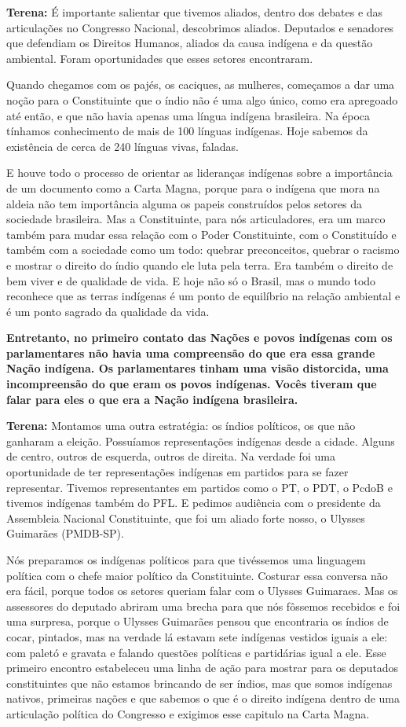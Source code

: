 \textbf{Terena:} É importante salientar que tivemos aliados, dentro dos
debates e das articulações no Congresso Nacional, descobrimos aliados.
Deputados e senadores que defendiam os Direitos Humanos, aliados da
causa indígena e da questão ambiental. Foram oportunidades que esses
setores encontraram.

Quando chegamos com os pajés, os caciques, as mulheres, começamos a dar
uma noção para o Constituinte que o índio não é uma algo único, como era
apregoado até então, e que não havia apenas uma língua indígena
brasileira. Na época tínhamos conhecimento de mais de 100 línguas
indígenas. Hoje sabemos da existência de cerca de 240 línguas vivas,
faladas.

E houve todo o processo de orientar as lideranças indígenas sobre a
importância de um documento como a Carta Magna, porque para o indígena
que mora na aldeia não tem importância alguma os papeis construídos
pelos setores da sociedade brasileira. Mas a Constituinte, para nós
articuladores, era um marco também para mudar essa relação com o Poder
Constituinte, com o Constituído e também com a sociedade como um todo:
quebrar preconceitos, quebrar o racismo e mostrar o direito do índio
quando ele luta pela terra. Era também o direito de bem viver e de
qualidade de vida. E hoje não só o Brasil, mas o mundo todo reconhece
que as terras indígenas é um ponto de equilíbrio na relação ambiental e
é um ponto sagrado da qualidade da vida.

\textbf{Entretanto, no primeiro contato das Nações e povos indígenas com
os parlamentares não havia uma compreensão do que era essa grande Nação
indígena. Os parlamentares tinham uma visão distorcida, uma
incompreensão do que eram os povos indígenas. Vocês tiveram que falar
para eles o que era a Nação indígena brasileira.}

\textbf{Terena:} Montamos uma outra estratégia: os índios políticos, os
que não ganharam a eleição. Possuíamos representações indígenas desde a
cidade. Alguns de centro, outros de esquerda, outros de direita. Na
verdade foi uma oportunidade de ter representações indígenas em partidos
para se fazer representar. Tivemos representantes em partidos como o PT,
o PDT, o PcdoB e tivemos indígenas também do PFL. E pedimos audiência
com o presidente da Assembleia Nacional Constituinte, que foi um aliado
forte nosso, o Ulysses Guimarães (PMDB-SP).

Nós preparamos os indígenas políticos para que tivéssemos uma linguagem
política com o chefe maior político da Constituinte. Costurar essa
conversa não era fácil, porque todos os setores queriam falar com o
Ulysses Guimaraes. Mas os assessores do deputado abriram uma brecha para
que nós fôssemos recebidos e foi uma surpresa, porque o Ulysses
Guimarães pensou que encontraria os índios de cocar, pintados, mas na
verdade lá estavam sete indígenas vestidos iguais a ele: com paletó e
gravata e falando questões políticas e partidárias igual a ele. Esse
primeiro encontro estabeleceu uma linha de ação para mostrar para os
deputados constituintes que não estamos brincando de ser índios, mas que
somos indígenas nativos, primeiras nações e que sabemos o que é o
direito indígena dentro de uma articulação política do Congresso e
exigimos esse capitulo na Carta Magna.

